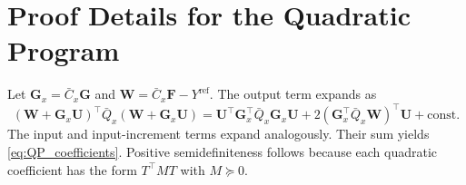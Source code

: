 ﻿\documentclass[journal]{IEEEtran}
\newcommand{\mF}{\mathbf{F}}
\newcommand{\mG}{\mathbf{G}}
\newcommand{\mU}{\mathbf{U}}
\newcommand{\mW}{\mathbf{W}}
\begin{document}
\section{Proof Details for the Quadratic Program}
\label{app:qp}

Let $\mG_x=\bar C_x\mG$ and $\mW=\bar C_x\mF-Y^{\mathrm{ref}}$. The output term expands as
\begin{equation}
    (\mW+\mG_x\mU)^\top\bar Q_x(\mW+\mG_x\mU)
    =\mU^\top\mG_x^\top\bar Q_x\mG_x\mU
    +2(\mG_x^\top\bar Q_x\mW)^\top\mU+\mathrm{const}.
\end{equation}
The input and input-increment terms expand analogously. Their sum yields \eqref{eq:QP_coefficients}. Positive semidefiniteness follows because each quadratic coefficient has the form $T^\top MT$ with $M\succeq0$.
\end{document}
